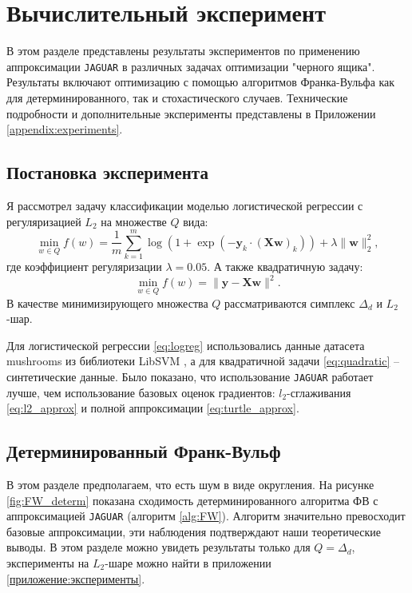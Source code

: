 \section{Вычислительный эксперимент} \label{sec:experiments}

    В этом разделе представлены результаты экспериментов по применению аппроксимации \texttt{JAGUAR} в различных задачах оптимизации "черного ящика". Результаты включают оптимизацию с помощью алгоритмов Франка-Вульфа как для детерминированного, так и стохастического случаев. Технические подробности и дополнительные эксперименты представлены в Приложении \ref{appendix:experiments}.

\subsection{Постановка эксперимента}

    Я рассмотрел задачу классификации моделью логистической регрессии с регуляризацией $L_2$ на множестве $Q$ вида:
    \begin{equation} \label{eq:logreg}
        \min_{w \in Q} f(w) = \frac{1}{m} \sum_{k = 1}^{m} \log \left( 1 + \exp \left( -\mathbf{y}_k \cdot (\mathbf{X} \mathbf{w})_k \right) \right) + \lambda \| \mathbf{w} \|_2^2,
    \end{equation}
    где коэффициент регуляризации $\lambda=0.05$. А также квадратичную задачу:
    \begin{equation} \label{eq:quadratic}
        \min_{w \in Q} f(w) = \| \mathbf{y} - \mathbf{X} \mathbf{w} \|^2.
    \end{equation}
    В качестве минимизирующего множества $Q$ рассматриваются симплекс $\Delta_d$ и $L_2$-шар.
    
    Для логистической регрессии \eqref{eq:logreg} использовались данные датасета mushrooms из библиотеки LibSVM \citep{chang2011libsvm}, а для квадратичной задачи \eqref{eq:quadratic} -- синтетические данные. Было показано, что использование \texttt{JAGUAR} работает лучше, чем использование базовых оценок градиентов: $l_2$-сглаживания \eqref{eq:l2_approx} и полной аппроксимации \eqref{eq:turtle_approx}.

\subsection{Детерминированный Франк-Вульф}

    В этом разделе предполагаем, что есть шум в виде округления. На рисунке \ref{fig:FW_determ} показана сходимость детерминированного алгоритма ФВ с аппроксимацией \texttt{JAGUAR} (алгоритм \ref{alg:FW}). Алгоритм значительно превосходит базовые аппроксимации, эти наблюдения подтверждают наши теоретические выводы. В этом разделе можно увидеть результаты только для $Q = \Delta_d$, эксперименты на $L_2$-шаре можно найти в приложении \ref{приложение:эксперименты}.

